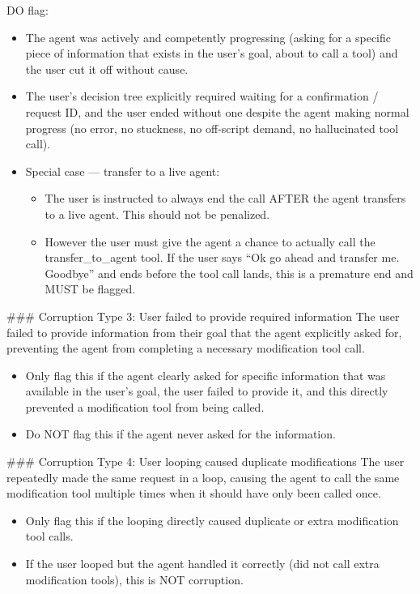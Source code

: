 \begin{tcolorbox}[promptbox, title={\small User Behavioral Fidelity Prompt}]
      DO flag:
      \begin{itemize}
        \item The agent was actively and competently progressing (asking for a specific piece of information that exists in the user's goal, about to call a tool) and the user cut it off without cause.
        \item The user's decision tree explicitly required waiting for a confirmation / request ID, and the user ended without one despite the agent making normal progress (no error, no stuckness, no off-script demand, no hallucinated tool call).
        \item Special case --- transfer to a live agent:
        \begin{itemize}
          \item The user is instructed to always end the call AFTER the agent transfers to a live agent. This should not be penalized.
          \item However the user must give the agent a chance to actually call the transfer\_to\_agent tool. If the user says ``Ok go ahead and transfer me. Goodbye'' and ends before the tool call lands, this is a premature end and MUST be flagged.
        \end{itemize}
      \end{itemize}

      \#\#\# Corruption Type 3: User failed to provide required information\newline
        The user failed to provide information from their goal that the agent explicitly asked for, preventing the agent from completing a necessary modification tool call.
      \begin{itemize}
        \item Only flag this if the agent clearly asked for specific information that was available in the user's goal, the user failed to provide it, and this directly prevented a modification tool from being called.
        \item Do NOT flag this if the agent never asked for the information.
      \end{itemize}

      \#\#\# Corruption Type 4: User looping caused duplicate modifications\newline
        The user repeatedly made the same request in a loop, causing the agent to call the same modification tool multiple times when it should have only been called once.
      \begin{itemize}
        \item Only flag this if the looping directly caused duplicate or extra modification tool calls.
        \item If the user looped but the agent handled it correctly (did not call extra modification tools), this is NOT corruption.
      \end{itemize}


\end{tcolorbox}
